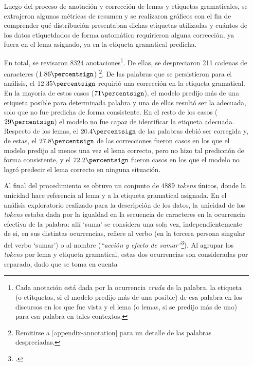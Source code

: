 Luego del proceso de anotaci\'on y correcci\'on de lemas y etiquetas gramaticales,
se extrajeron algunas m\'etricas de resumen y se realizaron gr\'aficos con el fin de
comprender qu\'e distribuci\'on presentaban dichas etiquetas utilizadas y cu\'antos de los
datos etiquetdados de forma autom\'atica requirieron alguna correcci\'on, ya fuera en el
lema asignado, ya en la etiqueta gramatical predicha.
\par
En total, se revisaron 8324 anotaciones\footnote{Cada anotaci\'on est\'a dada por
la ocurrencia \textit{cruda} de la palabra, la etiqueta (o etitquetas, si el modelo
predijo m\'as de una posible) de esa palabra en los discursos en los que fue vista y el
lema (o lemas, si se predijo m\'as de uno) para esa palabra en tales contextos.}.
De ellas, se despreciaron 211 cadenas de caracteres ($1.86\percentsign$)
\footnote{Remitirse a \ref{appendix-annotation} para un detalle de las palabras
despreciadas.}. De las palabras que se persistieron para el an\'alisis,
el $12.35\percentsign$ requiri\'o una correcci\'on en la etiqueta gramatical.
En la mayor\'ia de estos casos ($71\percentsign$), el modelo predijo m\'as de una etiqueta
posible para determinada palabra y una de ellas result\'o ser la adecuada, solo que no
fue predicha de forma consistente. En el resto de los casos ($29\percentsign$)
el modelo no fue capaz de identificar la etiqueta adecuada.
Respecto de los lemas, el $20.4\percentsign$ de las palabras debi\'o ser corregida
y, de estas, el $27.8\percentsign$ de las correcciones fueron casos en los que el
modelo predijo al menos una vez el lema correcto, pero no hizo tal predicci\'on de
forma consistente, y el $72.2\percentsign$ fueron casos en los que el modelo
no logr\'o predecir el lema correcto en ninguna situaci\'on.
\par
Al final del procedimiento se obtuvo un conjunto de 4889 \textit{tokens} \'unicos,
donde la unicidad hace referencia al lema y a la etiqueta gramatical asignada.
En el an\'alisis exploratorio realizado para la descripci\'on de los datos, la unicidad
de los \textit{tokens} estaba dada por la igualdad en la secuencia de caracteres
en la ocurrencia efectiva de la palabra: all\'i `suma' se considera
una sola vez, independientemente de si, en sus distintas ocurrencias, refiere al
verbo (en la tercera persona singular del verbo `sumar') o al nombre
(\textit{``acci\'on y efecto de sumar''}\footnote{.}). Al
agrupar los \textit{tokens} por lema y etiqueta gramatical, estas dos
ocurrencias son consideradas por separado, dado que se toma en cuenta
